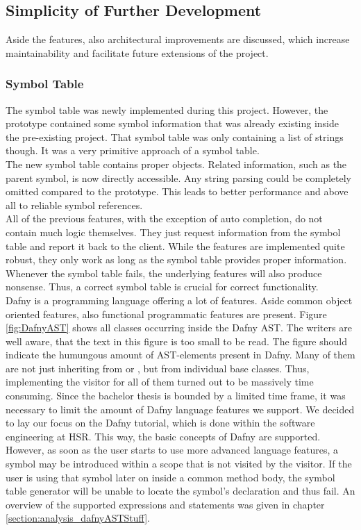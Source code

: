 \subsection{Simplicity of Further Development}
Aside the features, also architectural improvements are discussed,
which increase maintainability and facilitate future extensions of the project.

\subsubsection{Symbol Table}
The symbol table was newly implemented during this project.
However, the prototype contained some symbol information that was already existing inside the pre-existing project.
That symbol table was only containing a list of strings though.
It was a very primitive approach of a symbol table.\\

The new symbol table contains proper objects.
Related information, such as the parent symbol, is now directly accessible.
Any string parsing could be completely omitted compared to the prototype.
This leads to better performance and above all to reliable symbol references.\\

All of the previous features, with the exception of auto completion, do not contain much logic themselves.
They just request information from the symbol table and report it back to the client.
While the features are implemented quite robust, they only work as long as the symbol table provides proper information.\\

Whenever the symbol table fails, the underlying features will also produce nonsense.
Thus, a correct symbol table is crucial for correct functionality.\\

Dafny is a programming language offering a lot of features.
Aside common object oriented features, also functional programmatic features are present.
Figure \ref{fig:DafnyAST} shows all classes occurring inside the Dafny AST.
The writers are well aware, that the text in this figure is too small to be read.
The figure should indicate the humungous amount of AST-elements present in Dafny.
Many of them are not just inheriting from  or , but from individual base classes.
Thus, implementing the visitor for all of them turned out to be massively time consuming.
Since the bachelor thesis is bounded by a limited time frame, it was necessary to limit the amount of Dafny language features we support.
We decided to lay our focus on the Dafny tutorial, which is done within the software engineering at HSR.
This way, the basic concepts of Dafny are supported.
However, as soon as the user starts to use more advanced language features, a symbol may be introduced within a scope that is not visited by the visitor.
If the user is using that symbol later on inside a common method body, the symbol table generator will be unable to locate the symbol's declaration and thus fail.
An overview of the supported expressions and statements was given in chapter \ref{section:analysis_dafnyASTStuff}.\\


